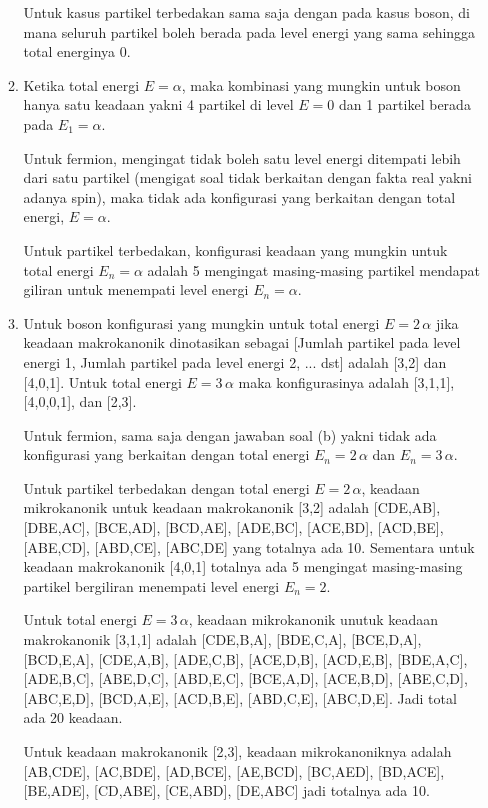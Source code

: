 \documentclass[a4paper , 12 pt]{article}
\begin{document}
\begin{enumerate}
\begin{enumerate}
Untuk kasus partikel terbedakan sama saja dengan pada kasus boson, di mana seluruh partikel boleh berada pada level energi yang sama sehingga total energinya 0. 
\item Ketika total energi $E =  \alpha$, maka kombinasi yang mungkin untuk boson hanya satu keadaan yakni 4 partikel di level $E = 0$ dan 1 partikel berada pada $E_1 = \alpha$. 

Untuk fermion, mengingat tidak boleh satu level energi  ditempati lebih dari satu partikel (mengigat soal tidak berkaitan dengan fakta real yakni adanya spin), maka tidak ada konfigurasi yang berkaitan dengan total energi, $E = \alpha$.

Untuk partikel terbedakan, konfigurasi keadaan yang mungkin untuk total energi $E_n = \alpha$ adalah 5 mengingat masing-masing partikel mendapat giliran untuk menempati level energi $E_n = \alpha$. 
\item Untuk boson konfigurasi yang mungkin untuk total energi $E = 2 \, \alpha$ jika keadaan makrokanonik  dinotasikan sebagai [Jumlah partikel pada level energi 1, Jumlah partikel pada level energi 2, ... dst] adalah 
[3,2] dan [4,0,1]. 
Untuk total energi $E = 3\, \alpha$ maka konfigurasinya adalah [3,1,1], [4,0,0,1], dan [2,3].

Untuk fermion, sama saja dengan jawaban soal (b) yakni tidak ada konfigurasi yang berkaitan dengan total energi $E_n = 2\,\alpha$ dan  $E_n = 3\,\alpha$.

Untuk partikel terbedakan dengan  total energi $E = 2\, \alpha$,  keadaan mikrokanonik untuk keadaan makrokanonik [3,2] adalah [CDE,AB], [DBE,AC], [BCE,AD], [BCD,AE], [ADE,BC], [ACE,BD], [ACD,BE], [ABE,CD], [ABD,CE], [ABC,DE] yang totalnya ada 10. 
Sementara untuk keadaan makrokanonik [4,0,1] totalnya ada 5 mengingat masing-masing partikel bergiliran menempati level energi $E_n = 2$.

Untuk total energi $E = 3\, \alpha$, keadaan mikrokanonik unutuk keadaan makrokanonik [3,1,1] adalah [CDE,B,A], [BDE,C,A], [BCE,D,A], [BCD,E,A], [CDE,A,B], [ADE,C,B], [ACE,D,B], [ACD,E,B], [BDE,A,C], [ADE,B,C], [ABE,D,C], [ABD,E,C], [BCE,A,D], [ACE,B,D], [ABE,C,D], [ABC,E,D], [BCD,A,E], [ACD,B,E], [ABD,C,E], [ABC,D,E]. Jadi total ada 20 keadaan. 

Untuk keadaan makrokanonik [2,3], keadaan mikrokanoniknya adalah [AB,CDE], [AC,BDE], [AD,BCE], [AE,BCD], [BC,AED], [BD,ACE], [BE,ADE], [CD,ABE], [CE,ABD], [DE,ABC] jadi totalnya ada 10. 


\end{enumerate}
\end{enumerate}
\end{document}
